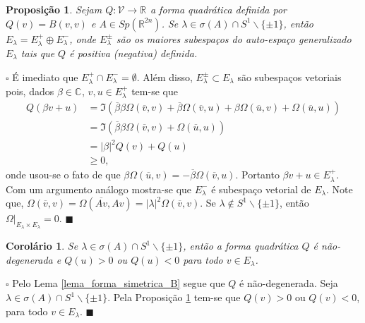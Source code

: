 \documentclass[12pt]{book}
\newtheorem{corolario}[teorema]{Corolário}
\newtheorem{proposicao}[teorema]{Proposição}
\newenvironment{prova}[1]{$\square$ #1}{\hfill$\blacksquare$}
\newcommand{\autoespaco}[1]{E_{#1}}
\newcommand{\circulo}{S^{1}}
\newcommand{\complementar}[2]{#1 \backslash #2}
\newcommand{\complexificado}[1]{\mathcal{#1}}
\newcommand{\complexo}[1]{\mathbb{C}^{#1}}
\newcommand{\espectrooperador}[1]{\sigma(#1)}
\newcommand{\formaSimpleticaExtendida}[2]{\Omega(#1, #2)}
\newcommand{\gruposimpletico}[1]{Sp(#1)}
\newcommand{\parteImaginaria}[1]{\Im(#1)}
\newcommand{\real}[1]{\mathbb{R}^{#1}}
\newcommand{\reta}{\real{}}
\begin{document}
	\begin{proposicao}\label{proposicao_forma_quadratica_Q}
		Sejam  $Q: \complexificado{V} \to \reta$ a forma quadrática definida por $Q(v) = B(v,v)$ e $A \in \gruposimpletico{\real{2n}}$. Se $\lambda\in \espectrooperador{A} \cap \complementar{\circulo}{\{\pm 1 \} }$, então   $\autoespaco{\lambda} = \autoespaco{\lambda}^{+}\oplus \autoespaco{\lambda}^{-}$, onde $\autoespaco{\lambda}^{\pm}$ são os maiores subespaços do auto-espaço generalizado $\autoespaco{\lambda}$ tais que $Q$ é positiva (negativa) definida.
	\end{proposicao}
	\begin{prova}
		É imediato que $\autoespaco{\lambda}^{+} \cap \autoespaco{\lambda}^{-} = \emptyset$. Além disso, $\autoespaco{\lambda}^{\pm} \subset \autoespaco{\lambda}$ são subespaços vetoriais pois, dados $\beta\in \complexo{}$, $v, u\in \autoespaco{\lambda}^{+}$ tem-se que 
		$$
		\begin{aligned}
		Q(\beta v +u) &= \parteImaginaria{\overline{\beta}\beta\formaSimpleticaExtendida{\overline{v}}{v}+ \overline{\beta}\formaSimpleticaExtendida{\overline{v}}{u}+ \beta\formaSimpleticaExtendida{\overline{u}}{v}+ \formaSimpleticaExtendida{\overline{u}}{u}}
		\\
		&=\parteImaginaria{\overline{\beta}\beta\formaSimpleticaExtendida{\overline{v}}{v}+ \formaSimpleticaExtendida{\overline{u}}{u}}
		\\
		&=|\beta|^{2}Q(v)+Q(u)
		\\
		&\geq0,
		\end{aligned}
		$$
		onde usou-se o fato de que $\beta\formaSimpleticaExtendida{\overline{u}}{v}=-\overline{\beta}\formaSimpleticaExtendida{\overline{v}}{u}$. Portanto $\beta v +u \in \autoespaco{\lambda}^{+}$. Com um argumento análogo mostra-se que $\autoespaco{\lambda}^{-}$ é subespaço vetorial de $\autoespaco{\lambda}$. Note que, $\formaSimpleticaExtendida{\overline{v}}{v}=\formaSimpleticaExtendida{\overline{Av}}{Av} =|\lambda|^{2}\formaSimpleticaExtendida{\overline{v}}{v}$. Se $\lambda \notin \complementar{\circulo}{\{\pm 1 \} }$, então $\Omega|_{\autoespaco{\lambda}\times \autoespaco{\lambda}} = 0$.
	\end{prova}
	
	\begin{corolario}\label{corolario_nao_degeneracidade_Q}
		Se $\lambda\in \espectrooperador{A} \cap \complementar{\circulo}{\{\pm 1 \} }$, então a forma quadrática $Q$ é não-degenerada e $Q(u)>0$ ou $Q(u)<0$ para todo $v \in \autoespaco{\lambda}$.
	\end{corolario}
	\begin{prova}
		Pelo Lema \ref{lema_forma_simetrica_B} segue que $Q$ é não-degenerada. Seja $\lambda\in \espectrooperador{A} \cap \complementar{\circulo}{\{\pm 1 \} }$. Pela Proposição \ref{proposicao_forma_quadratica_Q} tem-se que $Q(v)>0$ ou $Q(v)<0$, para todo $v\in \autoespaco{\lambda}$. 
	\end{prova}
	
\end{document}
